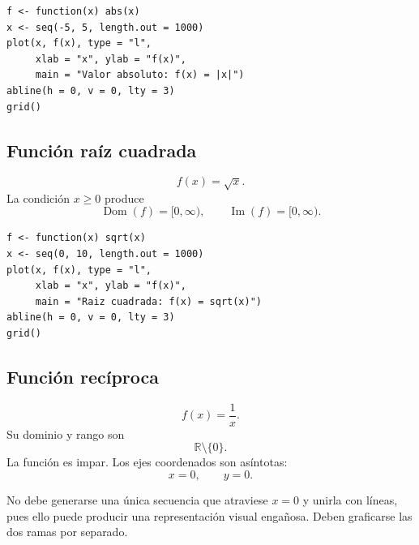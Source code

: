 \documentclass[12pt]{article}
\theoremstyle{remark}
\newcommand{\R}{\mathbb{R}}
\newcommand{\Dom}{\operatorname{Dom}}
\newcommand{\Ima}{\operatorname{Im}}
\begin{document}
\begin{verbatim}
f <- function(x) abs(x)
x <- seq(-5, 5, length.out = 1000)
plot(x, f(x), type = "l",
     xlab = "x", ylab = "f(x)",
     main = "Valor absoluto: f(x) = |x|")
abline(h = 0, v = 0, lty = 3)
grid()
\end{verbatim}

\subsection{Función raíz cuadrada}

\[
f(x)=\sqrt{x}.
\]
La condición $x\geq0$ produce
\[
\Dom(f)=[0,\infty),\qquad \Ima(f)=[0,\infty).
\]

\begin{center}
\end{center}

\begin{verbatim}
f <- function(x) sqrt(x)
x <- seq(0, 10, length.out = 1000)
plot(x, f(x), type = "l",
     xlab = "x", ylab = "f(x)",
     main = "Raiz cuadrada: f(x) = sqrt(x)")
abline(h = 0, v = 0, lty = 3)
grid()
\end{verbatim}

\subsection{Función recíproca}

\[
f(x)=\frac{1}{x}.
\]
Su dominio y rango son
\[
\R\setminus\{0\}.
\]
La función es impar. Los ejes coordenados son asíntotas:
\[
x=0,\qquad y=0.
\]

No debe generarse una única secuencia que atraviese $x=0$ y unirla con líneas,
pues ello puede producir una representación visual engañosa. Deben graficarse
las dos ramas por separado.

\begin{center}
\end{center}
\end{document}
